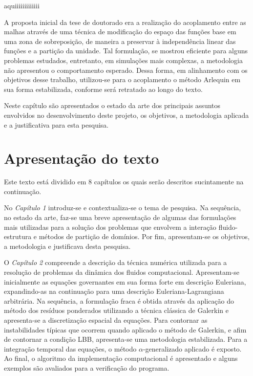 \documentclass[tese_patricia.tex]{subfiles}
\begin{document}
aquiiiiiiiiiiiii

A proposta inicial da tese de doutorado era a realização do acoplamento entre as malhas através de uma técnica de modificação do espaço das funções base em uma zona de sobreposição, de maneira a preservar à independência linear das funções e a partição da unidade. Tal formulação, se mostrou eficiente para alguns problemas estudados, entretanto, em simulações mais complexas, a metodologia não apresentou o comportamento esperado. Dessa forma, em alinhamento com os objetivos desse trabalho, utilizou-se para o acoplamento o método Arlequin em sua forma estabilizada, conforme será retratado ao longo do texto. 

Neste capítulo são apresentados o estado da arte dos principais assuntos envolvidos no desenvolvimento deste projeto, os objetivos, a metodologia aplicada e a justificativa para esta pesquisa.


\section{Apresentação do texto}

Este texto está dividido em 8 capítulos os quais serão descritos sucintamente na continuação.

No \textit{Capítulo 1} introduz-se e contextualiza-se o tema de pesquisa. Na sequência, no estado da arte, faz-se uma breve apresentação de algumas das formulações mais utilizadas para a solução dos problemas que envolvem a interação fluido-estrutura e métodos de partição de domínios. Por fim, apresentam-se os objetivos, a metodologia e justificava desta pesquisa.

O \textit{Capítulo 2} compreende a descrição da técnica numérica utilizada para a resolução de problemas da dinâmica dos fluidos computacional. 
Apresentam-se inicialmente as equações governantes em sua forma forte em descrição Euleriana, expandindo-as na continuação para uma descrição Euleriana-Lagrangiana arbitrária. Na sequência, a formulação fraca é obtida através da aplicação do método dos resíduos ponderados utilizando a técnica clássica de Galerkin e apresenta-se a discretização espacial da equações. Para contornar as instabilidades típicas que ocorrem quando aplicado o método de Galerkin, e afim de contornar a condição LBB, apresenta-se uma metodologia estabilizada. Para a integração temporal das equações, o método $\alpha$-generalizado aplicado é exposto. Ao final, o algoritmo da implementação computacional é apresentado e alguns exemplos são avaliados para a verificação do programa.
\end{document}
